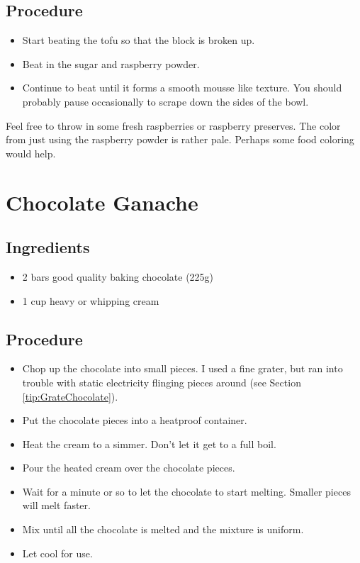\documentclass[10pt, openany]{book}
\begin{document}
\subsection{Procedure}
\begin{itemize}
  \item Start beating the tofu so that the block is broken up.
  \item Beat in the sugar and raspberry powder.
  \item Continue to beat until it forms a smooth mousse like texture.  You should probably pause occasionally to scrape down the sides of the bowl.
\end{itemize}
Feel free to throw in some fresh raspberries or raspberry preserves.  The color from just using the raspberry powder is rather pale.  Perhaps some food coloring would help.

\section{Chocolate Ganache}
\label{extra:ChocolateGanache}
\subsection{Ingredients}
\begin{itemize}
  \item 2 bars good quality baking chocolate (225g)
  \item 1 cup heavy or whipping cream
\end{itemize}
\subsection{Procedure}
\begin{itemize}
  \item Chop up the chocolate into small pieces.  I used a fine grater, but ran into trouble with static electricity flinging pieces around (see Section \ref{tip:GrateChocolate}).
  \item Put the chocolate pieces into a heatproof container.
  \item Heat the cream to a simmer.  Don't let it get to a full boil.
  \item Pour the heated cream over the chocolate pieces.
  \item Wait for a minute or so to let the chocolate to start melting.  Smaller pieces will melt faster.
  \item Mix until all the chocolate is melted and the mixture is uniform.
  \item Let cool for use.
\end{itemize}
\end{document}
